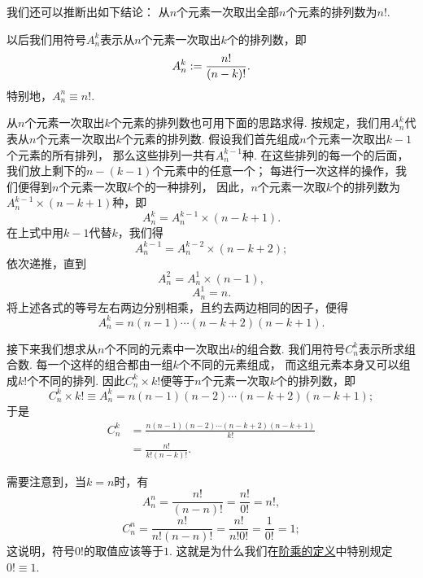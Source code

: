 我们还可以推断出如下结论：
从\(n\)个元素一次取出全部\(n\)个元素的排列数为\(n!\).

以后我们用符号\(A_n^k\)表示从\(n\)个元素一次取出\(k\)个的排列数，即\begin{equation}
	A_n^k := \frac{n!}{(n-k)!}.
\end{equation}
特别地，\(A_n^n \equiv n!\).

从\(n\)个元素一次取出\(k\)个元素的排列数也可用下面的思路求得.
按规定，我们用\(A_n^k\)代表从\(n\)个元素一次取出\(k\)个元素的排列数.
假设我们首先组成\(n\)个元素一次取出\(k-1\)个元素的所有排列，
那么这些排列一共有\(A_n^{k-1}\)种.
在这些排列的每一个的后面，我们放上剩下的\(n-(k-1)\)个元素中的任意一个；
每进行一次这样的操作，我们便得到\(n\)个元素一次取\(k\)个的一种排列，
因此，\(n\)个元素一次取\(k\)个的排列数为\(A_n^{k-1} \times (n-k+1)\)种，即\begin{equation*}
	A_n^k = A_n^{k-1} \times (n-k+1).
\end{equation*}
在上式中用\(k-1\)代替\(k\)，我们得\begin{equation*}
	A_n^{k-1} = A_n^{k-2} \times (n-k+2);
\end{equation*}
依次递推，直到\begin{equation*}
	A_n^2 = A_n^1 \times (n-1),
\end{equation*}\begin{equation*}
	A_n^1 = n.
\end{equation*}
将上述各式的等号左右两边分别相乘，且约去两边相同的因子，便得\begin{equation*}
	A_n^k = n(n-1)\dotsm(n-k+2)(n-k+1).
\end{equation*}

接下来我们想求从\(n\)个不同的元素中一次取出\(k\)的组合数.
我们用符号\(C_n^k\)表示所求组合数.
每一个这样的组合都由一组\(k\)个不同的元素组成，
而这组元素本身又可以组成\(k!\)个不同的排列.
因此\(C_n^k \times k!\)便等于\(n\)个元素一次取\(k\)个的排列数，即\begin{equation*}
	C_n^k \times k! \equiv A_n^k
	= n(n-1)(n-2)\dotsm(n-k+2)(n-k+1);
\end{equation*}于是\begin{align}
	C_n^k &= \frac{n(n-1)(n-2)\dotsm(n-k+2)(n-k+1)}{k!} \\
	&= \frac{n!}{k! (n-k)!}.
\end{align}

需要注意到，当\(k=n\)时，有\begin{equation*}
	A_n^n = \frac{n!}{(n-n)!} = \frac{n!}{0!} = n!,
\end{equation*}\begin{equation*}
	C_n^n = \frac{n!}{n! (n-n)!} = \frac{n!}{n! 0!} = \frac{1}{0!} = 1;
\end{equation*}
这说明，符号\(0!\)的取值应该等于\(1\).
这就是为什么我们在\hyperref[definition:数列.阶乘的定义]{阶乘的定义}中特别规定\(0!\equiv1\).

